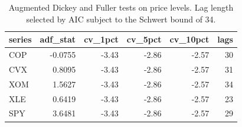 \begin{table}[ht]
\centering
\caption{Augmented Dickey and Fuller tests on price levels. Lag length selected by AIC subject to the Schwert bound of 34.} 
\label{tab:adf_levels}
\begin{tabular}{lrrrrr}
  \toprule
series & adf\_stat & cv\_1pct & cv\_5pct & cv\_10pct & lags \\ 
  \midrule
COP & -0.0755 & -3.43 & -2.86 & -2.57 & 30 \\ 
  CVX & 0.8095 & -3.43 & -2.86 & -2.57 & 31 \\ 
  XOM & 1.5627 & -3.43 & -2.86 & -2.57 & 34 \\ 
  XLE & 0.6419 & -3.43 & -2.86 & -2.57 & 23 \\ 
  SPY & 3.6481 & -3.43 & -2.86 & -2.57 & 29 \\ 
   \bottomrule
\end{tabular}
\end{table}
